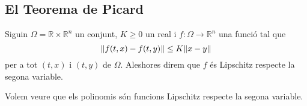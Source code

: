 \documentclass[../Apunts.tex]{subfiles}
\begin{document}
	\subsection{El Teorema de Picard}
	\begin{definition}
		\label{def:funció Lipschitz respecte la segona variable}
		Siguin \(\Omega=\mathbb{R}\times\mathbb{R}^{n}\) un conjunt, \(K\geq0\) un real i \(f\colon\Omega\longrightarrow\mathbb{R}^{n}\) una funció tal que
		\[\norm{f(t,x)-f(t,y)}\leq K\norm{x-y}\]
		per a tot \((t,x)\) i \((t,y)\) de \(\Omega\). Aleshores direm que \(f\) és Lipschitz respecte la segona variable.
	\end{definition}
	\begin{example}
		\label{ex:els polinomis són funcions Lipschitz respecte la segona variable}
		Volem veure que els polinomis són funcions Lipschitz respecte la segona variable.
		\begin{solution}
		\end{solution}
	\end{example}
\end{document}
